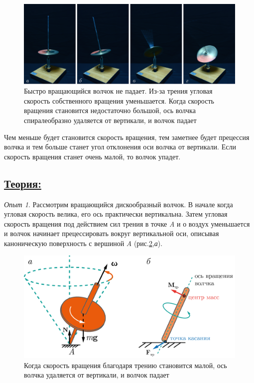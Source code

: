 \documentclass[14pt,a4paper,oneside]{extarticle}	%
\begin{document}
			\begin{figure}[H] 	
	\centering 	
	\includegraphics[width=0.9\linewidth]{gyro-5.png}
	\caption{Быстро вращающийся волчок не падает. Из-за трения угловая скорость собственного вращения уменьшается. Когда скорость вращения становится недостаточно большой, ось волчка спиралеобразно удаляется от вертикали, и волчок падает}
	\label{gyro-5}
\end{figure}

Чем меньше будет становится скорость вращения, тем заметнее будет прецессия волчка и тем больше станет угол отклонения оси волчка от вертикали.
Если скорость вращения станет очень малой, то волчок упадет.

\newpage
		\subsection*{\underline{Теория:}}
			
			\textit{Опыт 1}. Рассмотрим вращающийся дискообразный волчок.
			В начале когда угловая скорость велика, его ось практически вертикальна.
			Затем угловая скорость вращения под действием сил трения в точке  \textit{A} и о воздух уменьшается и волчок начинает прецессировать вокруг вертикальной оси, описывая каноническую поверхность с вершиной \textit{A} (рис.\ref{gyro-6},\textit{а}).
			
			\begin{figure}[H] 	
				\centering 	
				\includegraphics[width=0.75\linewidth]{gyro-6.png}
				\caption{Когда скорость вращения благодаря трению становится малой, ось волчка удаляется от вертикали, и волчок падает}
				\label{gyro-6}
			\end{figure}
			
\end{document}
